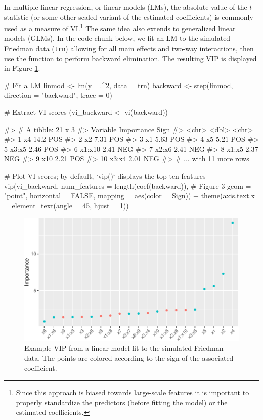 In multiple linear regression, or linear models (LMs), the absolute
value of the \(t\)-statistic (or some other scaled variant of the
estimated coefficients) is commonly used as a measure of VI.\footnote{Since
  this approach is biased towards large-scale features it is important
  to properly standardize the predictors (before fitting the model) or
  the estimated coefficients.} The same idea also extends to generalized
linear models (GLMs). In the code chunk below, we fit an LM to the
simulated Friedman data (\texttt{trn}) allowing for all main effects and
two-way interactions, then use the  function to perform
backward elimination. The resulting VIP is displayed in Figure
\ref{fig:vip-step}.

\begin{Schunk}
\begin{Sinput}
# Fit a LM
linmod <- lm(y ~ .^2, data = trn)
backward <- step(linmod, direction = "backward", trace = 0)

# Extract VI scores
(vi_backward <- vi(backward))
\end{Sinput}
\begin{Soutput}
#> # A tibble: 21 x 3
#>    Variable Importance Sign
#>    <chr>         <dbl> <chr>
#>  1 x4            14.2  POS
#>  2 x2             7.31 POS
#>  3 x1             5.63 POS
#>  4 x5             5.21 POS
#>  5 x3:x5          2.46 POS
#>  6 x1:x10         2.41 NEG
#>  7 x2:x6          2.41 NEG
#>  8 x1:x5          2.37 NEG
#>  9 x10            2.21 POS
#> 10 x3:x4          2.01 NEG
#> # ... with 11 more rows
\end{Soutput}
\begin{Sinput}
# Plot VI scores; by default, `vip()` displays the top ten features
vip(vi_backward, num_features = length(coef(backward)),  # Figure 3
    geom = "point", horizontal = FALSE, mapping = aes(color = Sign)) +
  theme(axis.text.x = element_text(angle = 45, hjust = 1))
\end{Sinput}
\begin{figure}[!htb]

{\centering \includegraphics[width=0.7\linewidth]{greenwell-boehmke_files/figure-latex/vip-step-1}

}

\caption[Example VIP from a linear model fit to the simulated Friedman data]{Example VIP from a linear model fit to the simulated Friedman data. The points are colored according to the sign of the associated coefficient.}\label{fig:vip-step}
\end{figure}
\end{Schunk}

